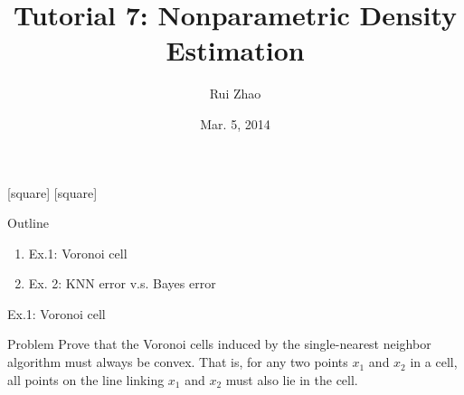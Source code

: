 \documentclass[compress,blue]{beamer}
\title[ENGG 5202 Pattern Recognition Tutorial 4]{Tutorial 7: Nonparametric Density Estimation}
\author{Rui Zhao}
\institute{rzhao@ee.cuhk.edu.hk}
\date{Mar. 5, 2014}
\begin{document}
\begin{frame}
\titlepage
\end{frame}

[square]
[square]

\begin{frame}{Outline}
	\begin{enumerate}
		\item<1> Ex.1: Voronoi cell
		\vspace{0.1in}
		\item<0> Ex. 2: KNN error v.s. Bayes error
	\end{enumerate}
\end{frame}

{ %
    \begin{frame}[plain]
     \end{frame}
}

\begin{frame}{Ex.1: Voronoi cell}
	\begin{block}{Problem}
		Prove that the Voronoi cells induced by the single-nearest neighbor algorithm
		must always be convex. That is, for any two points $x_1$ and $x_2$ in a cell, all points on the line linking $x_1$ and $x_2$ must also lie in the cell.
	\end{block}
\end{frame}
\end{document}
